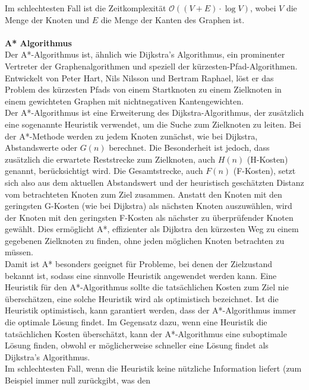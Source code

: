 \begin{itemize}
    Im schlechtesten Fall ist die Zeitkomplexität $\mathcal{O}((V+E)\cdot\log V)$, wobei $V$ die Menge der Knoten und $E$
    die Menge der Kanten des Graphen ist. \cite{cormen2022}\\\\
    \textbf{A* Algorithmus}\\
    Der A*-Algorithmus ist, ähnlich wie Dijkstra's Algorithmus, ein prominenter Vertreter der Graphenalgorithmen und speziell
    der kürzesten-Pfad-Algorithmen.
    Entwickelt von Peter Hart, Nils Nilsson und Bertram Raphael, löst er das Problem des kürzesten Pfads von einem Startknoten
    zu einem Zielknoten in einem gewichteten Graphen mit nichtnegativen Kantengewichten. \cite{hart1968}\\
    Der A*-Algorithmus ist eine Erweiterung des Dijkstra-Algorithmus, der zusätzlich eine sogenannte Heuristik verwendet,
    um die Suche zum Zielknoten zu leiten.
    Bei der A*-Methode werden zu jedem Knoten zunächst, wie bei Dijkstra, Abstandswerte oder $G(n)$ berechnet.
    Die Besonderheit ist jedoch, dass zusätzlich die erwartete Reststrecke zum Zielknoten, auch $H(n)$ (H-Kosten) genannt, berücksichtigt wird.
    Die Gesamtstrecke, auch $F(n)$ (F-Kosten), setzt sich also aus dem aktuellen Abstandswert und der heuristisch geschätzten
    Distanz vom betrachteten Knoten zum Ziel zusammen.
    Anstatt den Knoten mit den geringsten G-Kosten (wie bei Dijkstra) als nächsten Knoten auszuwählen, wird der
    Knoten mit den geringsten F-Kosten als nächster zu überprüfender Knoten gewählt.
    Dies ermöglicht A*, effizienter als Dijkstra den kürzesten Weg zu einem gegebenen Zielknoten zu finden, ohne jeden
    möglichen Knoten betrachten zu müssen.\\
    Damit ist A* besonders geeignet für Probleme, bei denen der Zielzustand bekannt ist, sodass eine sinnvolle Heuristik angewendet werden kann. \cite{hart1968}
    Eine Heuristik für den A*-Algorithmus sollte die tatsächlichen Kosten zum Ziel nie überschätzen, eine solche Heuristik
    wird als optimistisch bezeichnet.
    Ist die Heuristik optimistisch, kann garantiert werden, dass der A*-Algorithmus immer die optimale Lösung findet.
    Im Gegensatz dazu, wenn eine Heuristik die tatsächlichen Kosten überschätzt, kann der A*-Algorithmus eine suboptimale
    Lösung finden, obwohl er möglicherweise schneller eine Lösung findet als Dijkstra's Algorithmus.\\
    Im schlechtesten Fall, wenn die Heuristik keine nützliche Information liefert (zum Beispiel immer null zurückgibt, was den

\end{itemize}
